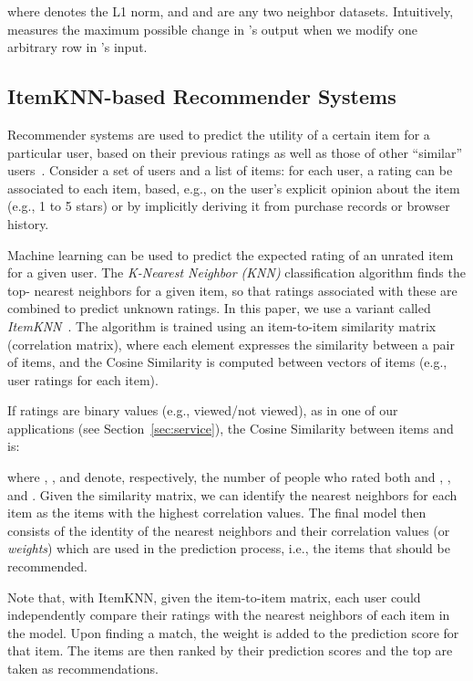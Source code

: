 \documentclass[conference]{IEEEtran}
\begin{document}
where  denotes the L1 norm, and  and  are any two neighbor datasets.
Intuitively,  measures the maximum possible change in 's output when we modify one arbitrary row in 's input.



\subsection{ItemKNN-based Recommender Systems}
\label{sec:recSystems}
Recommender systems are used to predict the utility of a certain item for a particular user, based on their previous ratings as well as those of other ``similar'' users~\cite{resnick1997recommender}.
Consider a set of  users and a list of  items:
for each user, a rating can be associated to each item, based, e.g., on the user's explicit opinion about the item (e.g., 1 to 5 stars) or by implicitly deriving it from purchase records or browser history.

Machine learning can be used to predict the expected rating of an unrated item for a given user. The \emph{K-Nearest Neighbor (KNN)} classification algorithm finds the top- nearest neighbors for a given item, so that ratings associated with these are combined to predict unknown ratings.
In this paper, we use a variant called \emph{ItemKNN}~\cite{sarwar2001item}. The algorithm is trained using an item-to-item similarity matrix (correlation matrix), where each element expresses the similarity between a pair of items, and the Cosine Similarity is computed between vectors of items (e.g., user ratings for each item).

If ratings are binary values (e.g., viewed/not viewed), as in one of our applications (see Section~\ref{sec:service}), the Cosine Similarity between items  and  is:

where , , and  denote, respectively, the number of people who rated both  and ,  , and .
Given the similarity matrix, we can identify the nearest neighbors for each item as the items with the highest correlation values. The final model then consists of the identity of the nearest neighbors and their correlation values (or \emph{weights}) which are used in the prediction process, i.e., the items that should be recommended. 

Note that, with ItemKNN, given the item-to-item matrix, each user could independently compare their ratings with the nearest neighbors of each item in the model. Upon finding a match, the weight is added to the prediction score for that item. The items are then ranked by their prediction scores and the top  are taken as recommendations.
\end{document}
